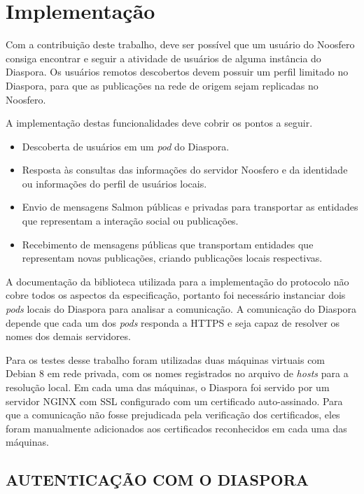 \chapter{Implementação}

Com a contribuição deste trabalho, deve ser possível que um usuário do Noosfero
consiga encontrar e seguir a atividade de usuários de alguma instância do Diaspora.
Os usuários remotos descobertos devem possuir um perfil limitado no Diaspora, para
que as publicações na rede de origem sejam replicadas no Noosfero.

A implementação destas funcionalidades deve cobrir os pontos a seguir.

\begin{itemize}
  \item{Descoberta de usuários em um \textit{pod} do Diaspora.}
  \item{Resposta às consultas das informações do servidor Noosfero e da identidade
        ou informações do perfil de usuários locais.}
  \item{Envio de mensagens Salmon públicas e privadas para transportar as entidades
        que representam a interação social ou publicações.}
  \item{Recebimento de mensagens públicas que transportam entidades que representam
        novas publicações, criando publicações locais respectivas.}
\end{itemize}

A documentação da biblioteca utilizada para a implementação do protocolo não cobre
todos os aspectos da especificação, portanto foi necessário instanciar dois
\textit{pods} locais do Diaspora para analisar a comunicação. A comunicação do
Diaspora depende que cada um dos \textit{pods} responda a HTTPS e seja capaz de
resolver os nomes dos demais servidores.

Para os testes desse trabalho foram utilizadas duas máquinas virtuais com Debian 8
em rede privada, com os nomes registrados no arquivo de \textit{hosts} para a
resolução local. Em cada uma das máquinas, o Diaspora foi servido por um servidor
NGINX com SSL configurado com um certificado auto-assinado. Para que a comunicação
não fosse prejudicada pela verificação dos certificados, eles foram manualmente
adicionados aos certificados reconhecidos em cada uma das máquinas.

\section{AUTENTICAÇÃO COM O DIASPORA}

